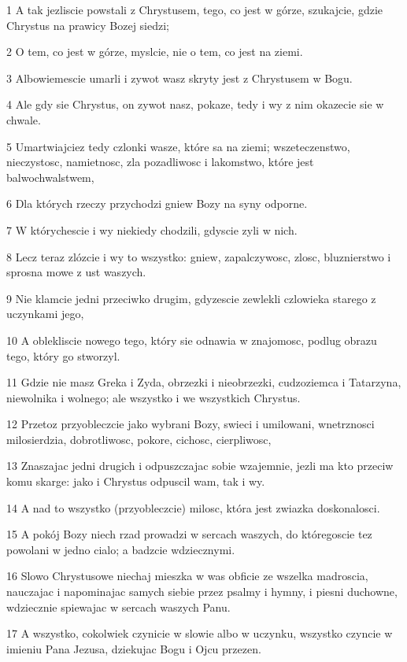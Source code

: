 \par 1 A tak jezliscie powstali z Chrystusem, tego, co jest w górze, szukajcie, gdzie Chrystus na prawicy Bozej siedzi;
\par 2 O tem, co jest w górze, myslcie, nie o tem, co jest na ziemi.
\par 3 Albowiemescie umarli i zywot wasz skryty jest z Chrystusem w Bogu.
\par 4 Ale gdy sie Chrystus, on zywot nasz, pokaze, tedy i wy z nim okazecie sie w chwale.
\par 5 Umartwiajciez tedy czlonki wasze, które sa na ziemi; wszeteczenstwo, nieczystosc, namietnosc, zla pozadliwosc i lakomstwo, które jest balwochwalstwem,
\par 6 Dla których rzeczy przychodzi gniew Bozy na syny odporne.
\par 7 W którychescie i wy niekiedy chodzili, gdyscie zyli w nich.
\par 8 Lecz teraz zlózcie i wy to wszystko: gniew, zapalczywosc, zlosc, bluznierstwo i sprosna mowe z ust waszych.
\par 9 Nie klamcie jedni przeciwko drugim, gdyzescie zewlekli czlowieka starego z uczynkami jego,
\par 10 A oblekliscie nowego tego, który sie odnawia w znajomosc, podlug obrazu tego, który go stworzyl.
\par 11 Gdzie nie masz Greka i Zyda, obrzezki i nieobrzezki, cudzoziemca i Tatarzyna, niewolnika i wolnego; ale wszystko i we wszystkich Chrystus.
\par 12 Przetoz przyobleczcie jako wybrani Bozy, swieci i umilowani, wnetrznosci milosierdzia, dobrotliwosc, pokore, cichosc, cierpliwosc,
\par 13 Znaszajac jedni drugich i odpuszczajac sobie wzajemnie, jezli ma kto przeciw komu skarge: jako i Chrystus odpuscil wam, tak i wy.
\par 14 A nad to wszystko (przyobleczcie) milosc, która jest zwiazka doskonalosci.
\par 15 A pokój Bozy niech rzad prowadzi w sercach waszych, do któregoscie tez powolani w jedno cialo; a badzcie wdziecznymi.
\par 16 Slowo Chrystusowe niechaj mieszka w was obficie ze wszelka madroscia, nauczajac i napominajac samych siebie przez psalmy i hymny, i piesni duchowne, wdziecznie spiewajac w sercach waszych Panu.
\par 17 A wszystko, cokolwiek czynicie w slowie albo w uczynku, wszystko czyncie w imieniu Pana Jezusa, dziekujac Bogu i Ojcu przezen.
